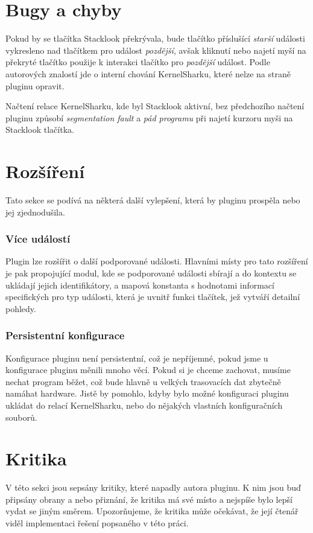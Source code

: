 \section{Bugy a chyby}

Pokud by se tlačítka Stacklook překrývala, bude tlačítko příslušící \emph{starší} události vykresleno nad tlačítkem pro událost \emph{pozdější}, avšak kliknutí nebo najetí myší na překryté tlačítko použije k interakci tlačítko pro \emph{pozdější} událost. Podle autorových znalostí jde o interní chování KernelSharku, které nelze na straně pluginu opravit.

Načtení relace KernelSharku, kde byl Stacklook aktivní, bez předchozího načtení pluginu způsobí \emph{segmentation fault} a \emph{pád programu} při najetí kurzoru myši na Stacklook tlačítka.

\section{Rozšíření}
Tato sekce se podívá na některá další vylepšení, která by pluginu prospěla nebo jej zjednodušila.

\subsubsection*{Více událostí}
Plugin lze rozšířit o další podporované události. Hlavními místy pro tato rozšíření je pak propojující modul, kde se podporované události sbírají a do kontextu se ukládají jejich identifikátory, a mapová konstanta s hodnotami informací specifických pro typ události, která je uvnitř funkci tlačítek, jež vytváří detailní pohledy.

\subsubsection*{Persistentní konfigurace}
Konfigurace pluginu není persistentní, což je nepříjemné, pokud jsme u konfigurace pluginu měnili mnoho věcí. Pokud si je chceme zachovat, musíme nechat program běžet, což bude hlavně u velkých trasovacích dat zbytečně namáhat hardware. Jistě by pomohlo, kdyby bylo možné konfiguraci pluginu ukládat do relací KernelSharku, nebo do nějakých vlastních konfiguračních souborů.

\section{Kritika}
V této sekci jsou sepsány kritiky, které napadly autora pluginu. K nim jsou buď připsány obrany a nebo přiznání, že kritika má své místo a nejspíše bylo lepší vydat se jiným směrem. Upozorňujeme, že kritika může očekávat, že její čtenář viděl implementaci řešení popsaného v této práci.

